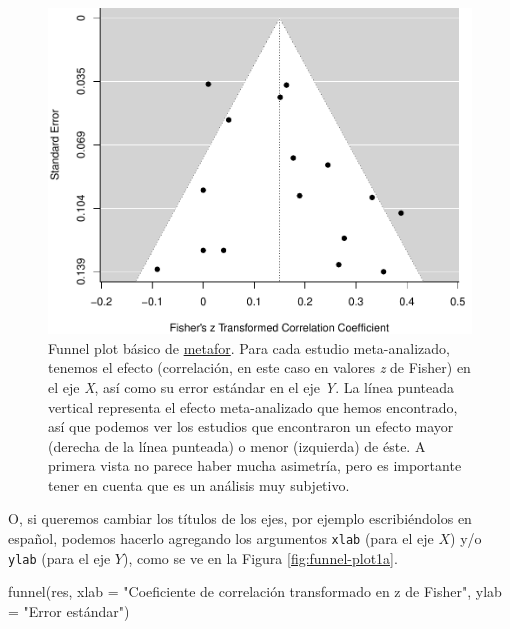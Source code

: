 \documentclass[
  bookmarksnumbered]{article}
\newenvironment{Shaded}{\begin{snugshade}}{\end{snugshade}}
\newcommand{\AttributeTok}[1]{\textcolor[rgb]{0.00,0.34,0.68}{#1}}
\newcommand{\FunctionTok}[1]{\textcolor[rgb]{0.39,0.29,0.61}{#1}}
\newcommand{\NormalTok}[1]{\textcolor[rgb]{0.12,0.11,0.11}{#1}}
\newcommand{\StringTok}[1]{\textcolor[rgb]{0.75,0.01,0.01}{#1}}
\begin{document}
\begin{figure}
\centering
\includegraphics{Meta-analysis_files/figure-latex/funnel-plot1-1.pdf}
\caption{\label{fig:funnel-plot1}Funnel plot básico de \href{https://www.metafor-project.org/doku.php}{metafor}. Para cada estudio meta-analizado, tenemos el efecto (correlación, en este caso en valores \emph{z} de Fisher) en el eje \emph{X}, así como su error estándar en el eje \emph{Y}. La línea punteada vertical representa el efecto meta-analizado que hemos encontrado, así que podemos ver los estudios que encontraron un efecto mayor (derecha de la línea punteada) o menor (izquierda) de éste. A primera vista no parece haber mucha asimetría, pero es importante tener en cuenta que es un análisis muy subjetivo.}
\end{figure}

O, si queremos cambiar los títulos de los ejes, por ejemplo escribiéndolos en español, podemos hacerlo agregando los argumentos \texttt{xlab} (para el eje \(X\)) y/o \texttt{ylab} (para el eje \(Y\)), como se ve en la Figura \ref{fig:funnel-plot1a}.

\begin{Shaded}
\begin{Highlighting}[]
\FunctionTok{funnel}\NormalTok{(res, }
       \AttributeTok{xlab =} \StringTok{"Coeficiente de correlación transformado en z de Fisher"}\NormalTok{,}
       \AttributeTok{ylab =} \StringTok{"Error estándar"}\NormalTok{)}
\end{Highlighting}
\end{Shaded}
\end{document}

